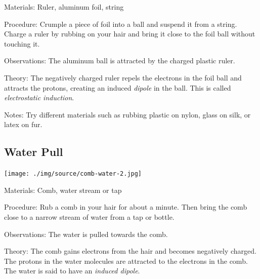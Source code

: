 \begin{multicols}{2}
\begin{description*}
\item[Materials:]{Ruler, aluminum foil, string}
\item[Procedure:]{Crumple a piece of foil into a ball and suspend it from a string. Charge a ruler by rubbing on your hair and bring it close to the foil ball without touching it.}
\item[Observations:]{The aluminum ball is attracted by the charged plastic ruler.}
\item[Theory:]{The negatively charged ruler repels the electrons in the foil ball and attracts the protons, creating an induced \emph{dipole} in the ball. This is called \emph{electrostatic induction}.}
\item[Notes:]{Try different materials such as rubbing plastic on nylon, glass on silk, or latex on fur.}
\end{description*}

\subsection{Water Pull}

\begin{center}
\texttt{[image: ./img/source/comb-water-2.jpg]}
\end{center}

\begin{description*}
\item[Materials:]{Comb, water stream or tap}
\item[Procedure:]{Rub a comb in your hair for about a minute. Then bring the comb close to a narrow stream of water from a tap or bottle.}
\item[Observations:]{The water is pulled towards the comb.}
\item[Theory:]{The comb gains electrons from the hair and becomes negatively charged. The protons in the water molecules are attracted to the electrons in the comb. The water is said to have an \emph{induced dipole}.}
\end{description*}


\end{multicols}
